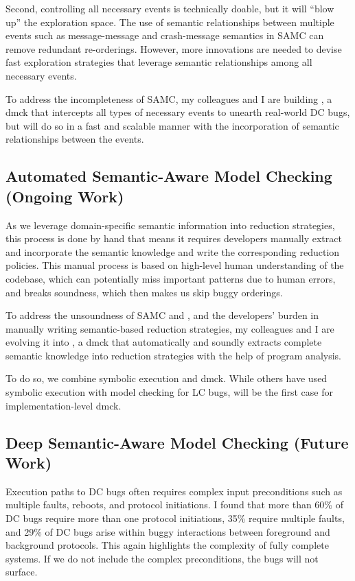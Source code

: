 \documentclass[11pt]{article}
\begin{document}
Second, controlling all necessary events is technically doable, but it will
``blow up'' the exploration space. The use of semantic relationships between
multiple events such as message-message and crash-message semantics in SAMC can
remove redundant re-orderings. However, more innovations are needed to devise
fast exploration strategies that leverage semantic relationships among all
necessary events.

To address the incompleteness of SAMC, my colleagues and I are building
\fullcheck, a dmck that intercepts all types of necessary events to unearth
real-world DC bugs, but will do so in a fast and scalable manner with the
incorporation of semantic relationships between the events.

\subsection{Automated Semantic-Aware Model Checking (Ongoing Work)} 

As we leverage domain-specific semantic information into reduction strategies,
this process is done by hand that means it requires developers manually extract
and incorporate the semantic knowledge and write the corresponding reduction
policies. This manual process is based on high-level human understanding of the
codebase, which can potentially miss important patterns due to human errors, and
breaks soundness, which then makes us skip buggy orderings.

To address the unsoundness of SAMC and \fullcheck, and the developers' burden in
manually writing semantic-based reduction strategies, my colleagues and I are
evolving it into \autocheck, a dmck that automatically and soundly extracts
complete semantic knowledge into reduction strategies with the help of program
analysis.

To do so, we combine symbolic execution and dmck. While others have used
symbolic execution with model checking for LC bugs, \autocheck will be the first
case for implementation-level dmck. 

\subsection{Deep Semantic-Aware Model Checking (Future Work)}

Execution paths to DC bugs often requires complex input preconditions such as
multiple faults, reboots, and protocol initiations. I found that more than 60\%
of DC bugs require more than one protocol initiations, 35\% require multiple
faults, and 29\% of DC bugs arise within buggy interactions between foreground
and background protocols.  This again highlights the complexity of fully
complete systems. If we do not include the complex preconditions, the bugs will
not surface.
\end{document}
